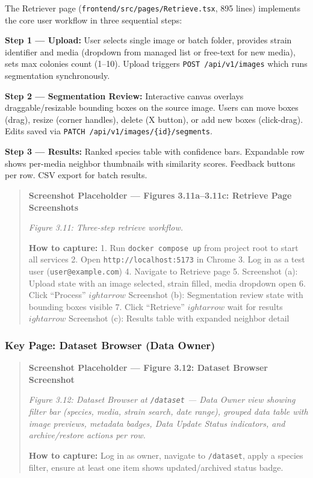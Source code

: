 The Retriever page (\texttt{frontend/src/pages/Retrieve.tsx}, 895 lines) implements the core user workflow in three sequential steps:

\textbf{Step 1 --- Upload:} User selects single image or batch folder, provides strain identifier and media (dropdown from managed list or free-text for new media), sets max colonies count (1--10). Upload triggers \texttt{POST\ /api/v1/images} which runs segmentation synchronously.

\textbf{Step 2 --- Segmentation Review:} Interactive canvas overlays draggable/resizable bounding boxes on the source image. Users can move boxes (drag), resize (corner handles), delete (X button), or add new boxes (click-drag). Edits saved via \texttt{PATCH\ /api/v1/images/\{id\}/segments}.

\textbf{Step 3 --- Results:} Ranked species table with confidence bars. Expandable row shows per-media neighbor thumbnails with similarity scores. Feedback buttons per row. CSV export for batch results.

\begin{quote}
\textbf{Screenshot Placeholder --- Figures 3.11a--3.11c: Retrieve Page Screenshots}

\emph{Figure 3.11: Three-step retrieve workflow.}

\textbf{How to capture:} 1. Run \texttt{docker\ compose\ up} from project root to start all services 2. Open \texttt{http://localhost:5173} in Chrome 3. Log in as a test user (\texttt{user@example.com}) 4. Navigate to Retrieve page 5. Screenshot (a): Upload state with an image selected, strain filled, media dropdown open 6. Click ``Process'' $
ightarrow$ Screenshot (b): Segmentation review state with bounding boxes visible 7. Click ``Retrieve'' $
ightarrow$ wait for results $
ightarrow$ Screenshot (c): Results table with expanded neighbor detail
\end{quote}

\subsubsection{Key Page: Dataset Browser (Data Owner)}\label{key-page-dataset-browser-data-owner}

\begin{quote}
\textbf{Screenshot Placeholder --- Figure 3.12: Dataset Browser Screenshot}

\emph{Figure 3.12: Dataset Browser at \texttt{/dataset} --- Data Owner view showing filter bar (species, media, strain search, date range), grouped data table with image previews, metadata badges, Data Update Status indicators, and archive/restore actions per row.}

\textbf{How to capture:} Log in as owner, navigate to \texttt{/dataset}, apply a species filter, ensure at least one item shows updated/archived status badge.
\end{quote}

